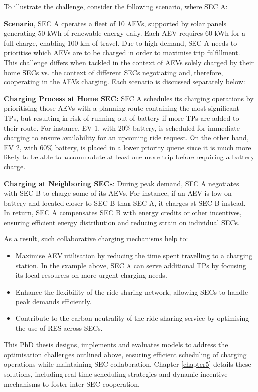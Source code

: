 To illustrate the challenge, consider the following scenario, where SEC A:

\textbf{Scenario}, SEC A operates a fleet of 10 AEVs, supported by solar panels generating 50 kWh of renewable energy daily. Each AEV requires 60 kWh for a full charge, enabling 100 km of travel. Due to high demand, SEC A needs to prioritise which AEVs are to be charged in order to maximise trip fulfillment. This challenge differs when tackled in the context of AEVs solely charged by their home SECs vs. the context of different SECs negotiating and, therefore, cooperating in the AEVs charging. Each scenario is discussed separately below:

\textbf{Charging Process at Home SEC:} SEC A schedules its charging operations by prioritising those AEVs with a planning route containing the most significant TPs, but resulting in risk of running out of battery if more TPs are added to their route. For instance, EV 1, with 20\% battery, is scheduled for immediate charging to ensure availability for an upcoming ride request. On the other hand, EV 2, with 60\% battery, is placed in a lower priority queue since it is much more likely to be able to accommodate at least one more trip before requiring a battery charge.

\textbf{Charging at Neighboring SECs}: During peak demand, SEC A negotiates with SEC B to charge some of its AEVs. For instance, if an AEV is low on battery and located closer to SEC B than SEC A, it charges at SEC B instead. In return, SEC A compensates SEC B with energy credits or other incentives, ensuring efficient energy distribution and reducing strain on individual SECs.

As a result, such collaborative charging mechanisms help to:
\begin{itemize}
    \item Maximise AEV utilisation by reducing the time spent travelling to a charging station. In the example above, SEC A can serve additional TPs by focusing its local resources on more urgent charging needs.
    \item Enhance the flexibility of the ride-sharing network, allowing SECs to handle peak demands efficiently.
    \item Contribute to the carbon neutrality of the ride-sharing service by optimising the use of RES across SECs.
\end{itemize}

This PhD thesis designs, implements and evaluates models to address the optimisation challenges outlined above, ensuring efficient scheduling of charging operations while maintaining SEC collaboration. Chapter \ref{chapter5} details these solutions, including real-time scheduling strategies and dynamic incentive mechanisms to foster inter-SEC cooperation.

